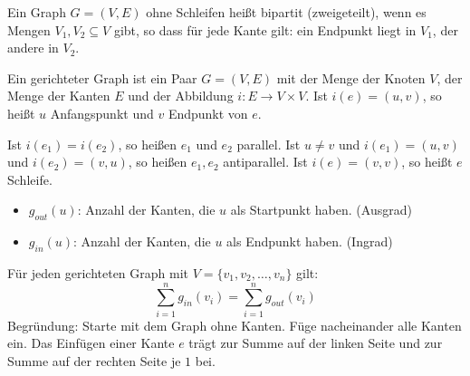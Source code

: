 \begin{definition}
	
	Ein Graph $G = (V, E)$ ohne Schleifen heißt bipartit (zweigeteilt), wenn es Mengen $V_1, V_2 \subseteq V$ gibt, so dass für jede Kante gilt: ein Endpunkt liegt in $V_1$, der andere in $V_2$.
\end{definition}


\begin{beispiel}
	\qquad
	\vspace{2mm}
	
\end{beispiel}


\begin{definition}

	Ein gerichteter Graph ist ein Paar $G = (V, E)$ mit der Menge der Knoten $V$, der Menge der Kanten $E$ und der Abbildung $i: E \rightarrow V \times V$. Ist $i(e) = (u, v)$, so heißt $u$ Anfangspunkt und $v$ Endpunkt von $e$.
	
	Ist $i(e_1) = i(e_2)$, so heißen $e_1$ und $e_2$ parallel. Ist $u \ne v$ und $i(e_1) = (u, v)$ und $i(e_2) = (v, u)$, so heißen $e_1, e_2$ antiparallel. Ist $i(e) = (v, v)$, so heißt $e$ Schleife.
	
	\begin{itemize}
		\item $g_{out}(u)$: Anzahl der Kanten, die $u$ als Startpunkt haben. (Ausgrad)
		\item $g_{in}(u)$: Anzahl der Kanten, die $u$ als Endpunkt haben. (Ingrad)
	\end{itemize}
\end{definition}


\begin{bemerkung}
	Für jeden gerichteten Graph mit $V = \{ v_1, v_2, \dots, v_n \}$ gilt: $$\sum_{i=1}^n g_{in}(v_i) = \sum_{i=1}^n g_{out}(v_i)$$
	Begründung: Starte mit dem Graph ohne Kanten. Füge nacheinander alle Kanten ein. Das Einfügen einer Kante $e$ trägt zur Summe auf der linken Seite und zur Summe auf der rechten Seite je $1$ bei.
\end{bemerkung}


